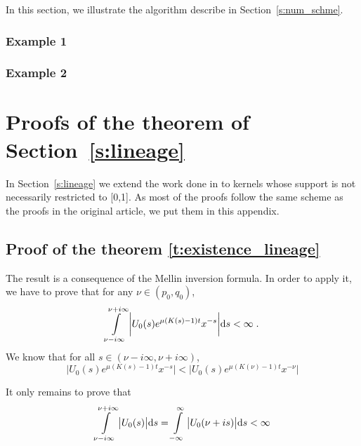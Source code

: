 \documentclass[11pt]{amsart}
\begin{document}
In this section, we illustrate the algorithm describe in Section~\ref{s:num_schme}. 
\subsubsection{Example 1}
\subsubsection{Example 2}

\section{Proofs of the theorem of Section~\ref{s:lineage}}
In Section~\ref{s:lineage} we extend the work done in \cite{doumic2016time} to kernels whose support is not necessarily restricted to [0,1]. As most of the proofs follow the same scheme as the proofs in the original article, we put them in this appendix. 

\subsection{Proof of the theorem \ref{t:existence_lineage}}
\label{proof:existence_lineage}
The result is a consequence of the Mellin inversion formula.
In order to apply it, we have to prove that for any $\nu \in (p_0, q_0)$, 
    \begin{equation*}
        \int\limits_{\nu - i \infty}^{\nu + i \infty} \bigg| U_0(s) e^{\mu(K(s) - 1) t} x^{-s} \bigg| \mathrm ds < \infty
        \; .
    \end{equation*}
We know that for all $s \in (\nu - i\infty, \nu + i\infty)$, 
    \begin{equation*}
         \bigg| U_0(s) e^{\mu(K(s) - 1) t} x^{-s} \bigg|  <   \bigg| U_0(s)  e^{\mu(K(\nu) - 1) t}  x^{-\nu} \bigg|
    \end{equation*}

It only remains to prove that 
    \begin{equation}
            \int\limits_{\nu - i \infty}^{\nu + i \infty} \big| U_0(s)\big| \mathrm ds 
            = 
            \int\limits_{-\infty}^{\infty} \big| U_0(\nu + is)\big| \mathrm ds
            < \infty
            \label{eq:DouEsc43}
    \end{equation}
\end{document}
